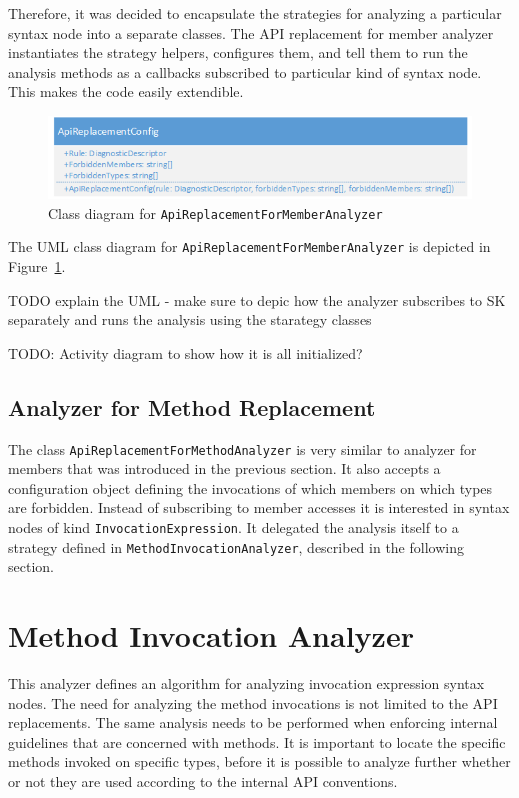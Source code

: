 \documentclass[
  digital, %
  table,   %
  lof,     %
  lot,     %
  oneside,
]{fithesis3}
\begin{document}
Therefore, it was decided to encapsulate the strategies for analyzing a particular syntax node into a separate classes. The API replacement for member analyzer instantiates the strategy helpers, configures them, and tell them to run the analysis methods as a callbacks subscribed to particular kind of syntax node. This makes the code easily extendible.

\begin{figure}[h!]
		\centering
			\includegraphics[scale=0.75]{img/uml/api-replacement-for-member}
		\caption{Class diagram for \texttt{ApiReplacementForMemberAnalyzer}}
		\label{fig:uml-api-replacement-for-member}
\end{figure}

The UML class diagram for \texttt{ApiReplacementForMemberAnalyzer} is depicted in Figure~\ref{fig:uml-api-replacement-for-member}.

TODO explain the UML - make sure to depic how the analyzer subscribes to SK separately and runs the analysis using the starategy classes

TODO: Activity diagram to show how it is all initialized?

\subsection{Analyzer for Method Replacement}
The class \texttt{ApiReplacementForMethodAnalyzer} is very similar to analyzer for members that was introduced in the previous section. It also accepts a configuration object defining the invocations of which members on which types are forbidden. 
Instead of subscribing to member accesses it is interested in syntax nodes of kind \texttt{InvocationExpression}. It delegated the analysis itself to a strategy defined in \texttt{MethodInvocationAnalyzer}, described in the following section.

\section{Method Invocation Analyzer}
This analyzer defines an algorithm for analyzing invocation expression syntax nodes. The need for analyzing the method invocations is not limited to the API replacements. The same analysis needs to be performed when enforcing internal guidelines that are concerned with methods. It is important to locate the specific methods invoked on specific types, before it is possible to analyze further whether or not they are used according to the internal API conventions. 
\end{document}
